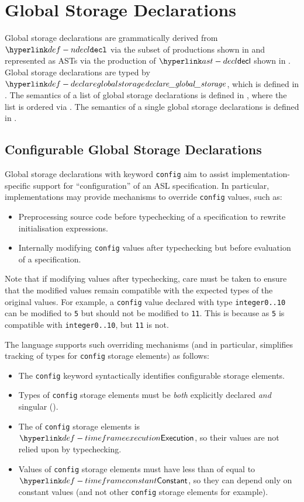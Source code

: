 \chapter{Global Storage Declarations\label{chap:GlobalStorageDeclarations}}

Global storage declarations are grammatically derived from $\Ndecl$ via the subset of productions shown in
 and represented as ASTs via the production of $\decl$
shown in .
%
Global storage declarations are typed by $\declareglobalstorage$, which is defined in .
%
The semantics of a list of global storage declarations is defined in ,
where the list is ordered via .
The semantics of a single global storage declarations is defined in .

\section{Configurable Global Storage Declarations}
Global storage declarations with keyword \texttt{config} aim to assist implementation-specific support for ``configuration'' of an ASL specification.
In particular, implementations may provide mechanisms to override \texttt{config} values, such as:
\begin{itemize}
  \item Preprocessing source code before typechecking of a specification to rewrite initialisation expressions.
  \item Internally modifying \texttt{config} values after typechecking but before evaluation of a specification.
\end{itemize}
Note that if modifying values after typechecking, care must be taken to ensure that the modified values remain compatible with the expected types of the original values.
For example, a \texttt{config} value declared with type \texttt{integer{0..10}} can be modified to \texttt{5} but should not be modified to \texttt{11}.
This is because as \texttt{5} is compatible with \texttt{integer{0..10}}, but \texttt{11} is not.

The language supports such overriding mechanisms (and in particular, simplifies tracking of types for \texttt{config} storage elements) as follows:
\begin{itemize}
  \item The \texttt{config} keyword syntactically identifies configurable storage elements.
  \item Types of \texttt{config} storage elements must be \emph{both} explicitly declared \emph{and} singular ().
  \item The \timeframeterm{} of \texttt{config} storage elements is $\timeframeexecution$, so their values are not relied upon by typechecking.
  \item Values of \texttt{config} storage elements must have \timeframeterm{} less than of equal to $\timeframeconstant$, so they can depend only on constant values (and not other \texttt{config} storage elements for example).
\end{itemize}

